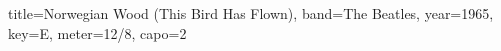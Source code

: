\documentclass{skrul-leadsheet}
\begin{document}
\begin{song}[transpose-capo=true]{title={Norwegian Wood (This Bird Has Flown)}, band={The Beatles}, year={1965}, key={E}, meter={12/8}, capo={2}}



\end{song}
\end{document}
